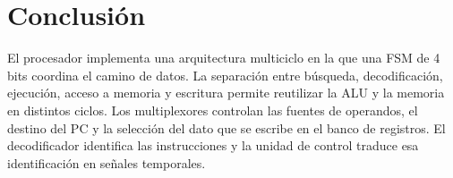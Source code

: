 \documentclass[11pt,a4paper]{article}
\begin{document}
\section{Conclusión}

El procesador implementa una arquitectura multiciclo en la que una FSM de 4 bits coordina el camino de datos. La separación entre búsqueda, decodificación, ejecución, acceso a memoria y escritura permite reutilizar la ALU y la memoria en distintos ciclos. Los multiplexores controlan las fuentes de operandos, el destino del PC y la selección del dato que se escribe en el banco de registros. El decodificador identifica las instrucciones y la unidad de control traduce esa identificación en señales temporales.
\end{document}
